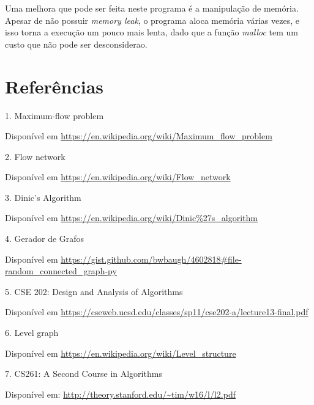 \documentclass[
	12pt,
	a4paper,
	onepage,
	brazil
]{article}
\theoremstyle{definition}
\begin{document}
	Uma melhora que pode ser feita neste programa é a manipulação de memória. Apesar de não possuir \textit{memory leak}, o programa aloca memória várias vezes, e isso torna a execução um pouco mais lenta, dado que a função \textit{malloc} tem um custo que não pode ser desconsiderao.
	
	\section{Referências}
	
	1. Maximum-flow problem
	
	Disponível em \url{https://en.wikipedia.org/wiki/Maximum_flow_problem}
	
	\hfill
	
	2. Flow network
	
	Disponível em \url{https://en.wikipedia.org/wiki/Flow_network}
	
	\hfill

	3. Dinic's Algorithm
	
	Disponível em \url{https://en.wikipedia.org/wiki/Dinic%27s_algorithm}
	
	\hfill
	
	4. Gerador de Grafos
	
	Disponível em \url{https://gist.github.com/bwbaugh/4602818#file-random_connected_graph-py}
	
	\hfill
	
	5. CSE 202: Design and Analysis of Algorithms
	
	Disponível em \url{https://cseweb.ucsd.edu/classes/sp11/cse202-a/lecture13-final.pdf}
	
	\hfill
	
	6. Level graph
	
	Disponível em \url{https://en.wikipedia.org/wiki/Level_structure}
	
	\hfill
	
	7. CS261: A Second Course in Algorithms
	
	Disponível em: \url{http://theory.stanford.edu/~tim/w16/l/l2.pdf}
\end{document}
